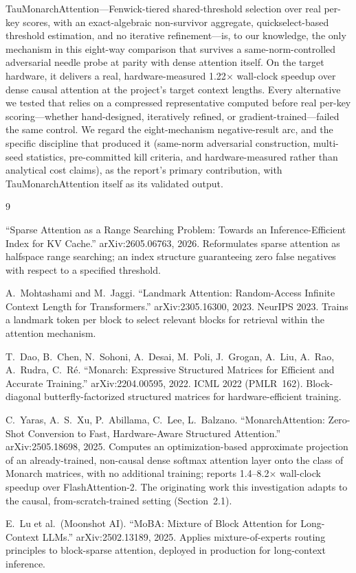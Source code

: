 \documentclass[11pt]{article}
\begin{document}
TauMonarchAttention---Fenwick-tiered shared-threshold selection over real per-key
scores, with an exact-algebraic non-survivor aggregate, quickselect-based threshold
estimation, and no iterative refinement---is, to our knowledge, the only mechanism in
this eight-way comparison that survives a same-norm-controlled adversarial needle probe
at parity with dense attention itself. On the target hardware, it delivers a real,
hardware-measured 1.22$\times$ wall-clock speedup over dense causal attention at the
project's target context lengths. Every alternative we tested that relies on a compressed
representative computed before real per-key scoring---whether hand-designed, iteratively
refined, or gradient-trained---failed the same control. We regard the eight-mechanism
negative-result arc, and the specific discipline that produced it (same-norm adversarial
construction, multi-seed statistics, pre-committed kill criteria, and hardware-measured
rather than analytical cost claims), as the report's primary contribution, with
TauMonarchAttention itself as its validated output.

\begin{thebibliography}{9}

``Sparse Attention as a Range Searching Problem: Towards an Inference-Efficient Index
for KV Cache.'' arXiv:2605.06763, 2026. Reformulates sparse attention as halfspace range
searching; an index structure guaranteeing zero false negatives with respect to a
specified threshold.

A.~Mohtashami and M.~Jaggi. ``Landmark Attention: Random-Access Infinite
Context Length for Transformers.'' arXiv:2305.16300, 2023. NeurIPS 2023. Trains a landmark
token per block to select relevant blocks for retrieval within the attention mechanism.

T.~Dao, B.~Chen, N.~Sohoni, A.~Desai, M.~Poli, J.~Grogan, A.~Liu, A.~Rao, A.~Rudra,
C.~R\'e. ``Monarch: Expressive Structured Matrices for Efficient and Accurate Training.''
arXiv:2204.00595, 2022. ICML 2022 (PMLR~162). Block-diagonal butterfly-factorized
structured matrices for hardware-efficient training.

C.~Yaras, A.~S.~Xu, P.~Abillama, C.~Lee, L.~Balzano. ``MonarchAttention:
Zero-Shot Conversion to Fast, Hardware-Aware Structured Attention.'' arXiv:2505.18698, 2025.
Computes an optimization-based approximate projection of an already-trained, non-causal
dense softmax attention layer onto the class of Monarch matrices, with no additional
training; reports 1.4--8.2$\times$ wall-clock speedup over FlashAttention-2. The
originating work this investigation adapts to the causal, from-scratch-trained setting
(Section~2.1).

E.~Lu et al.\ (Moonshot AI). ``MoBA: Mixture of Block Attention for Long-Context LLMs.''
arXiv:2502.13189, 2025. Applies mixture-of-experts routing principles to block-sparse
attention, deployed in production for long-context inference.

\end{thebibliography}
\end{document}
